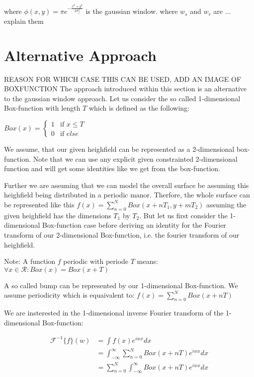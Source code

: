 where $\phi(x,y) = \pi e^{-\frac{x^2 + y^2}{2\sigma_{f}^2}}$ is the gaussian window.
where $w_s$ and $w_r$ are ... explain them

\section{Alternative Approach}
REASON FOR WHICH CASE THIS CAN BE USED, ADD AN IMAGE OF BOXFUNCTION
The approach introduced within this section is an alternative to the gaussian window approach.
Let us consider the so called 1-dimensional Box-function with length $T$ which is defined as the following: 

$
Box(x) =
\left\{
	\begin{array}{ll}
		1  & \mbox{if } x \leq T \\
		0 & \mbox{if } else
	\end{array}
\right.
$

We assume, that our given heighfield can be represented as a 2-dimensional box-function. 
Note that we can use any explicit given constrainted 2-dimensional function and will get some identities like
we get from the box-function.
 
Further we are assuming that we can model the overall surface be assuming this heighfield being distributed in a periodic manor.
Therfore, the whole surface can be represented like this $f(x) = \sum_{n=0}^{N} Box(x+nT_1, y+mT_2)$ assuming the given heighfield has the dimensions $T_1$ by $T_2$. But let us first consider the 1-dimensional Box-function case before deriving an identity for the Fourier transform of our 2-dimensional Box-function, i.e. the fourier transform of our heighfield. 

Note: A function $f$ periodic with periode $T$ means: $\forall x \in \mathcal{R}: Box(x) = Box(x+T)$

A so called bump can be represented by our 1-dimensional Box-function. We assume periodicity which is equaivalent to:   
$f(x) = \sum_{n=0}^{N} Box(x+nT)$

We are insterested in the 1-dimensional inverse Fourier transform of the 1-dimensional Box-function:

\begin{align*}
\mathcal{F}^{-1}\{f\}(w)
& =\int f(x) e^{iwx}dx\\
& =\int_{-\infty}^{\infty} \sum_{n=0}^{N} Box(x+nT) e^{iwx}dx\\
& =\sum_{n=0}^{N} \int_{-\infty}^{\infty} Box(x+nT) e^{iwx}dx
\end{align*}


